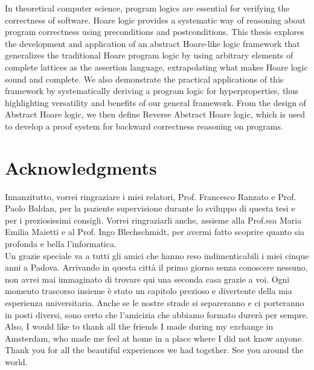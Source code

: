 \documentclass[
  10pt,       %
  twoside,    %
  a4paper,    %
  english,    %
  tikz,       %
  openright,  %
]{book}
\begin{document}
In theoretical computer science, program logics are essential for verifying the
correctness of software. Hoare logic provides a systematic way of reasoning
about program correctness using preconditions and postconditions. This thesis
explores the development and application of an abstract Hoare-like logic framework
that generalizes the traditional Hoare program logic by using arbitrary elements of
complete lattices as the assertion language, extrapolating what makes Hoare
logic sound and complete. We also demonstrate the practical applications of
this framework by systematically deriving a program logic for hyperproperties, thus highlighting
versatility and benefits of our general framework. From the design of Abstract Hoare logic, we
then define Reverse Abstract Hoare logic, which is used to develop a proof system for
backward correctness reasoning on programs.

\vfill
\cleardoublepage
{}
{}

\begingroup

\chapter*{Acknowledgments}

Innanzitutto, vorrei ringraziare i miei relatori, Prof. Francesco Ranzato e
Prof. Paolo Baldan, per la paziente supervisione durante lo sviluppo di questa
tesi e per i preziosissimi consigli. Vorrei ringraziarli anche, assieme alla
Prof.ssa Maria Emilia Maietti e al Prof. Ingo Blechschmidt, per avermi fatto
scoprire quanto sia profonda e bella l'informatica.
\\

Un grazie speciale va a tutti gli amici che hanno reso indimenticabili i miei
cinque anni a Padova. Arrivando in questa città il primo giorno senza conoscere
nessuno, non avrei mai immaginato di trovare qui una seconda casa grazie a voi.
Ogni momento trascorso insieme è stato un capitolo prezioso e divertente della
mia esperienza universitaria. Anche se le nostre strade si separeranno e ci
porteranno in posti diversi, sono certo che l'amicizia che abbiamo formato
durerà per sempre.
\\

Also, I would like to thank all the friends I made during my exchange in
Amsterdam, who made me feel at home in a place where I did not know anyone.
Thank you for all the beautiful experiences we had together. See you around the
world.
\\
\end{document}
